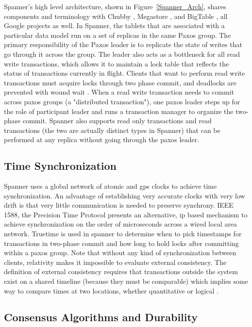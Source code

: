 \documentclass[10pt,twocolumn]{article}
\begin{document}
Spanner's high level architecture, shown in Figure~\ref{Spanner_Arch}, shares components and terminology with Chubby  \cite{chandra_paxos_2007}, Megastore \cite{baker_megastore:_2011}, and BigTable \cite{chang_bigtable:_2008}, all Google projects as well. In Spanner, the tablets that are associated with a particular data model run on a set of replicas in the same Paxos group. The primary responsibility of the Paxos leader is to replicate the state of writes that go through it across the group. The leader also acts as a bottleneck for all read write transactions, which allows it to maintain a lock table that reflects the status of transactions currently in flight. Clients that want to perform read write transactions must acquire locks through two phase commit, and deadlocks are prevented with wound wait \cite{wound_wait}. When a read write transaction needs to commit across paxos groups (a "distributed transaction"), one paxos leader steps up for the role of participant leader and runs a transaction manager to organize the two-phase commit. Spanner also supports read only transactions and read transactions (the two are actually distinct types in Spanner) that can be performed at any replica without going through the paxos leader.


\subsection{Time Synchronization}
Spanner uses a global network of atomic and gps clocks to achieve time synchronization. An advantage of establishing very accurate clocks with very low drift is that very little communication is needed to preserve synchrony. IEEE 1588, the Precision Time Protocol \cite{ratzel_toward_2012} presents an alternative, ip based mechanism to achieve synchronization on the order of microseconds across a wired local area network. Truetime is used in spanner to determine when to pick timestamps for transactions in two-phase commit and how long to hold locks after committing within a paxos group.  Note that without any kind of synchronization between clients, relativity makes it impossible to evaluate external consistency. The definition of external consistency requires that transactions outside the system exist on a shared timeline (because they must be comparable) which implies some way to compare times at two locations, whether quantitative or logical \cite{lamport_time_1978}.


\subsection{Consensus Algorithms and Durability}
\end{document}
